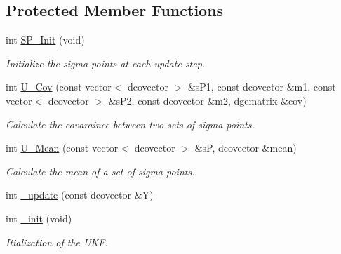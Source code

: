 \subsection*{Protected Member Functions}
\begin{CompactItemize}
\item 
int \hyperlink{class_unscented___kalman___filter_bbc48e2cfd73c0427cedea914e68ed1a}{SP\_\-Init} (void)
\begin{CompactList}\small\item\em Initialize the sigma points at each update step. \item\end{CompactList}\item 
int \hyperlink{class_unscented___kalman___filter_1229b08a8f97c4a877baedd390d0c55d}{U\_\-Cov} (const vector$<$ dcovector $>$ \&sP1, const dcovector \&m1, const vector$<$ dcovector $>$ \&sP2, const dcovector \&m2, dgematrix \&cov)
\begin{CompactList}\small\item\em Calculate the covaraince between two sets of sigma points. \item\end{CompactList}\item 
int \hyperlink{class_unscented___kalman___filter_5a6250da8fa76f0f5b22c9030e4ef157}{U\_\-Mean} (const vector$<$ dcovector $>$ \&sP, dcovector \&mean)
\begin{CompactList}\small\item\em Calculate the mean of a set of sigma points. \item\end{CompactList}\item 
int \hyperlink{class_unscented___kalman___filter_ee1e0a8035111d7695b6958c644f97cc}{\_\-update} (const dcovector \&Y)
\item 
int \hyperlink{class_unscented___kalman___filter_a6ca6d9f8b5a4a40c18b6cdfdc2029fa}{\_\-init} (void)
\begin{CompactList}\small\item\em Itialization of the UKF. \item\end{CompactList}\end{CompactItemize}
